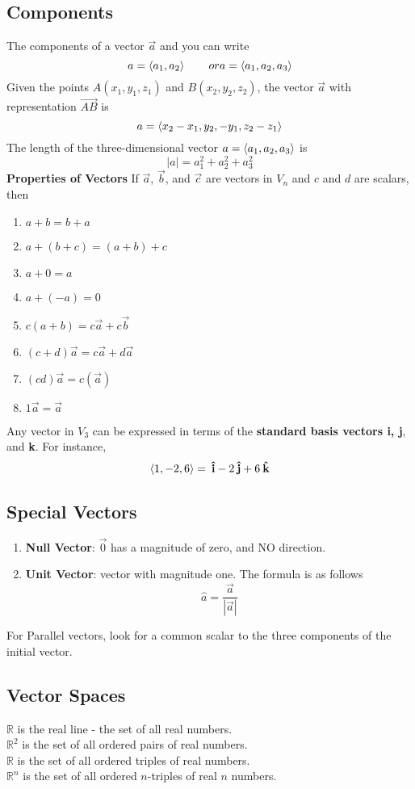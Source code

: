 \subsection*{Components}
The components of a vector $\vec{a}$ and you can write $$a = \ev{a_1, a_2}\qquad or a = \ev{a_1, a_2, a_3}$$
Given the points $A(x_1, y_1, z_1)$ and $B(x_2, y_2, z_2)$, the vector $\vec{a}$ with representation $\vec{AB}$ is
$$a = \ev{x_2 - x_1, y_2, - y_1, z_2 - z_1}$$
The length of the three-dimensional vector $a = \ev{a_1, a_2, a_3}$ is $$|a| = a^2_1 + a^2_2 + a^2_3$$
\textbf{Properties of Vectors} If $\vec{a}$, $\vec{b}$, and $\vec{c}$ are vectors in $V_n$ and $c$ and $d$ are scalars, then
\begin{enumerate}
    \item $a + b = b + a$
    \item $a + (b + c) = (a + b) + c$
    \item $a + 0 = a$
    \item $a + (-a) = 0$
    \item $c(a + b) = c\vec{a} + c\vec{b}$
    \item $(c + d)\vec{a} = c\vec{a} + d\vec{a}$
    \item $(cd)\vec{a} = c(\vec{a})$
    \item $1\vec{a} = \vec{a}$
\end{enumerate}
Any vector in $V_3$ can be expressed in terms of the \textbf{standard basis vectors i, j}, and \textbf{k}. For instance, 
$$\ev{1,-2,6} = \ihat - 2\jhat + 6\khat$$

\subsection*{Special Vectors}
\begin{enumerate}
    \item \textbf{Null Vector}: $\vec{0}$ has a magnitude of zero, and NO direction.
    \item \textbf{Unit Vector}: vector with magnitude one. The formula is as follows $$ \hat{a} = \frac{\vec{a}}{|\vec{a}|}$$
\end{enumerate}

For Parallel vectors, look for a common scalar to the three components of the initial vector. 

\subsection*{Vector Spaces}
$\mathbb{R}$ is the real line - the set of all real numbers. $$ $$ $\mathbb{R}^2$ is the set of all ordered pairs of real numbers. $$ $$
$\mathbb{R}$ is the set of all ordered triples of real numbers. $$ $$ $\mathbb{R}^n$ is the set of all ordered $n$-triples of real $n$ numbers.


